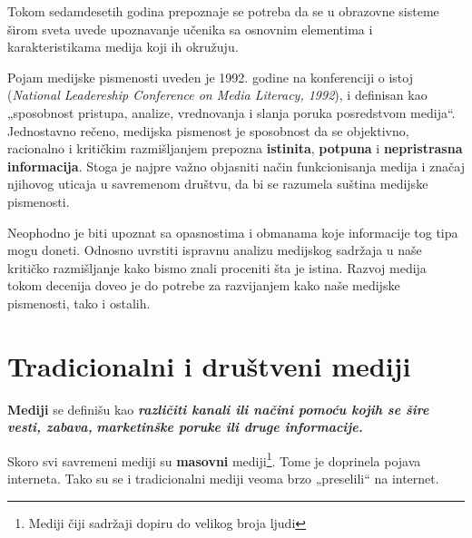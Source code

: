 \documentclass[a4paper]{article}
\begin{document}
Tokom sedamdesetih godina prepoznaje se potreba da se u obrazovne sisteme širom sveta uvede upoznavanje učenika sa osnovnim elementima i karakteristikama medija koji ih okružuju. 

Pojam medijske pismenosti uveden je 1992. godine na konferenciji o istoj (\emph{National Leadereship Conference on Media Literacy, 1992}), i definisan kao „sposobnost pristupa, analize, vrednovanja i slanja poruka posredstvom medija“. Jednostavno rečeno, medijska pismenost je sposobnost da se objektivno, racionalno i kritičkim razmišljanjem prepozna \textbf{istinita}, \textbf{potpuna} i \textbf{nepristrasna informacija}.  
Stoga je najpre važno objasniti način funkcionisanja medija i značaj njihovog uticaja u savremenom društvu, da bi se razumela suština medijske pismenosti.

Neophodno je biti upoznat sa opasnostima i obmanama koje informacije tog tipa mogu doneti. Odnosno uvrstiti ispravnu analizu medijskog sadržaja u naše kritičko razmišljanje kako bismo znali proceniti šta je istina. Razvoj medija tokom decenija doveo je do potrebe za razvijanjem kako naše medijske pismenosti, tako i ostalih.

\newpage

\section{Tradicionalni i društveni mediji}

	\textbf{{Mediji}} se definišu kao \emph{\textbf{{različiti kanali ili
			načini pomoću kojih se šire vesti, zabava,}}} \emph{\textbf{{marketinške
			poruke ili druge informacije.}}}

Skoro svi savremeni mediji su \textbf{masovni} mediji\footnote{Mediji čiji sadržaji dopiru do velikog broja ljudi}. Tome je doprinela
pojava interneta. Tako su se i tradicionalni mediji veoma brzo
„preselili`` na internet.
\end{document}
